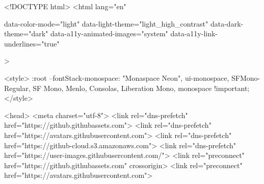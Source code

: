 





<!DOCTYPE html>
<html
  lang="en"
  
  data-color-mode="light" data-light-theme="light_high_contrast" data-dark-theme="dark"
  data-a11y-animated-images="system" data-a11y-link-underlines="true"
  
  >

    <style>
:root {
  --fontStack-monospace: "Monaspace Neon", ui-monospace, SFMono-Regular, SF Mono, Menlo, Consolas, Liberation Mono, monospace !important;
}
</style>




  <head>
    <meta charset="utf-8">
  <link rel="dns-prefetch" href="https://github.githubassets.com">
  <link rel="dns-prefetch" href="https://avatars.githubusercontent.com">
  <link rel="dns-prefetch" href="https://github-cloud.s3.amazonaws.com">
  <link rel="dns-prefetch" href="https://user-images.githubusercontent.com/">
  <link rel="preconnect" href="https://github.githubassets.com" crossorigin>
  <link rel="preconnect" href="https://avatars.githubusercontent.com">

  


